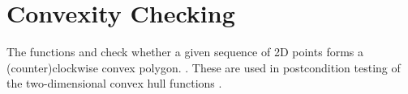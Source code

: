 \section{Convexity Checking}

The functions  and 
check whether a given sequence of 2D points forms a (counter)clockwise convex 
polygon.%
.  These are used in postcondition
testing of the two-dimensional convex hull functions%
.



